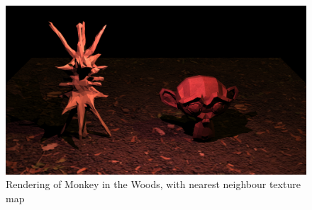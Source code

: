 \documentclass[a4paper]{myarticle}
\begin{document}
\begin{figure}[H]
    \centering
    \includegraphics[width=.85\textwidth]{q3/scene.png}
    \caption{Rendering of Monkey in the Woods, with nearest neighbour texture map}
\end{figure}
\end{document}
